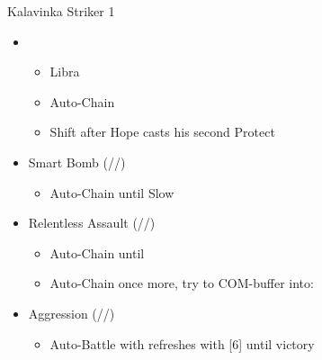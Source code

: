 	\renewcommand{\second}{[2] Smart Bomb (\rav/\rav/\sab)}
	\renewcommand{\third}{[3] Relentless Assault (\rav/\rav/\com)}
	\renewcommand{\fourth}{[4] Relentless Assault (\rav/\rav/\com)}
	\renewcommand{\fifth}{[5] Aggression (\com/\rav/\com)}
	\begin{battle}[0:52]{Kalavinka Striker 1}
		\begin{itemize}
			\item \first
			      \begin{itemize}
				      \item Libra
				      \item Auto-Chain
				      \item Shift after Hope casts his second Protect
			      \end{itemize}
			\item \second
			      \begin{itemize}
				      \item Auto-Chain until Slow
			      \end{itemize}
			\item \fourth
			      \begin{itemize}
				      \item Auto-Chain until \stagger
				      \item Auto-Chain once more, try to COM-buffer into:
			      \end{itemize}
			\item \fifth
			      \begin{itemize}
				      \item Auto-Battle with refreshes with [6] until victory
			      \end{itemize}
		\end{itemize}
	\end{battle}
	\vfill

